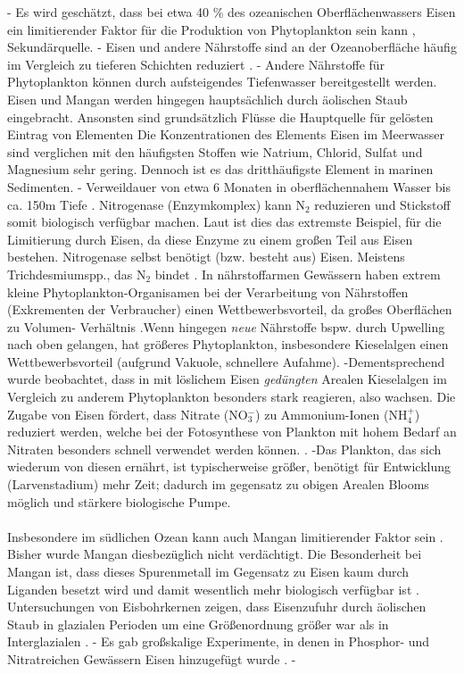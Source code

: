 \documentclass[12pt,a4paper,onecolumn,draft]{scrartcl}
\begin{document}
- Es wird geschätzt, dass bei etwa 40 \% des ozeanischen Oberflächenwassers Eisen ein limitierender Faktor für die Produktion von Phytoplankton sein kann \citep{Emerson.2009}, Sekundärquelle. - Eisen und andere Nährstoffe sind an der Ozeanoberfläche häufig im Vergleich zu tieferen Schichten reduziert \citep{Martin.1990}. - Andere Nährstoffe für Phytoplankton können durch aufsteigendes Tiefenwasser bereitgestellt werden. Eisen und Mangan werden hingegen hauptsächlich durch äolischen Staub eingebracht. Ansonsten sind grundsätzlich Flüsse die Hauptquelle für gelösten Eintrag von Elementen \citep{Emerson.2009} Die Konzentrationen des Elements Eisen im Meerwasser sind verglichen mit den häufigsten Stoffen wie Natrium, Chlorid, Sulfat und Magnesium sehr gering. Dennoch ist es das dritthäufigste Element in marinen Sedimenten. \citep{Emerson.2009} - Verweildauer von etwa 6 Monaten in oberflächennahem Wasser bis ca. 150m Tiefe \citep{Hayes.2015}. Nitrogenase (Enzymkomplex) kann N$_2$ reduzieren und Stickstoff somit biologisch verfügbar machen. Laut \citet{Emerson.2009} ist dies das extremste Beispiel, für die Limitierung durch Eisen, da diese Enzyme zu einem großen Teil aus Eisen bestehen. Nitrogenase selbst benötigt (bzw. besteht aus) Eisen. Meistens Trichdesmiumspp., das N$_2$ bindet \citep{Falkowski.1998}.  In nährstoffarmen Gewässern haben extrem kleine Phytoplankton-Organisamen bei der Verarbeitung von Nährstoffen (Exkrementen der Verbraucher) einen Wettbewerbsvorteil, da großes Oberflächen zu Volumen- Verhältnis \citep{Falkowski.1998}.Wenn hingegen \textit{neue} Nährstoffe bspw. durch Upwelling nach oben gelangen, hat größeres Phytoplankton, insbesondere Kieselalgen einen Wettbewerbsvorteil (aufgrund Vakuole, schnellere Aufahme). -Dementsprechend wurde beobachtet, dass in mit löslichem Eisen \textit{gedüngten} Arealen  Kieselalgen im Vergleich zu anderem Phytoplankton besonders stark reagieren, also wachsen. Die Zugabe von Eisen fördert, dass Nitrate (NO$_3^-$) zu Ammonium-Ionen (NH$_4^+$) reduziert werden, welche bei der Fotosynthese von Plankton mit hohem Bedarf an Nitraten besonders schnell verwendet werden können.  \citep{Emerson.2009}. -Das Plankton, das sich wiederum von diesen ernährt, ist typischerweise größer, benötigt für Entwicklung (Larvenstadium) mehr Zeit; dadurch im gegensatz zu obigen Arealen Blooms möglich und stärkere biologische Pumpe.
\\\\ Insbesondere im südlichen Ozean kann auch Mangan limitierender Faktor sein \citep{Browning.2021}. Bisher wurde Mangan diesbezüglich nicht verdächtigt. Die Besonderheit bei Mangan ist, dass dieses Spurenmetall im Gegensatz zu Eisen kaum durch Liganden besetzt wird und damit wesentlich mehr biologisch verfügbar ist \citep{Emerson.2009}. Untersuchungen von Eisbohrkernen zeigen, dass Eisenzufuhr durch äolischen Staub in glazialen Perioden um eine Größenordnung größer war als in Interglazialen \citep{Falkowski.1998}. - Es gab großskalige Experimente, in denen in Phosphor- und Nitratreichen Gewässern Eisen hinzugefügt wurde \citep{Emerson.2009}. -
\end{document}
